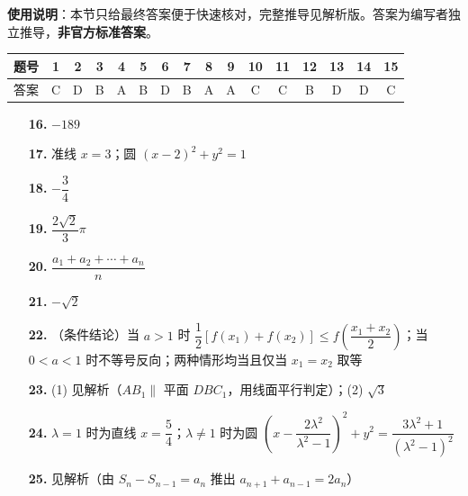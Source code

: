 
\begin{gknotice}
\textbf{使用说明}：本节只给最终答案便于快速核对，完整推导见解析版。答案为编写者独立推导，\textbf{非官方标准答案}。
\end{gknotice}

\begin{center}\begin{tabular}{cccccccccccccccc}
\toprule
题号 & 1 & 2 & 3 & 4 & 5 & 6 & 7 & 8 & 9 & 10 & 11 & 12 & 13 & 14 & 15 \\
\midrule
答案 & C & D & B & A & B & D & B & A & A & C & C & B & D & D & C \\
\bottomrule
\end{tabular}\end{center}

\begin{itemize}[leftmargin=2.6em]
  \item[\textbf{16.}] \(-189\)
  \item[\textbf{17.}] 准线 \(x=3\)；圆 \((x-2)^2+y^2=1\)
  \item[\textbf{18.}] \(-\dfrac34\)
  \item[\textbf{19.}] \(\dfrac{2\sqrt2}{3}\pi\)
  \item[\textbf{20.}] \(\dfrac{a_1+a_2+\cdots+a_n}{n}\)
\end{itemize}

\begin{itemize}[leftmargin=2.6em]
  \item[\textbf{21.}] \(-\sqrt2\)
  \item[\textbf{22.}] （条件结论）当 \(a>1\) 时 \(\dfrac12[f(x_1)+f(x_2)]\le f\!\left(\dfrac{x_1+x_2}{2}\right)\)；当 \(0<a<1\) 时不等号反向；两种情形均当且仅当 \(x_1=x_2\) 取等
  \item[\textbf{23.}] (1) 见解析（\(AB_1\parallel\) 平面 \(DBC_1\)，用线面平行判定）；(2) \(\sqrt3\)
  \item[\textbf{24.}] \(\lambda=1\) 时为直线 \(x=\dfrac54\)；\(\lambda\ne1\) 时为圆 \(\left(x-\dfrac{2\lambda^2}{\lambda^2-1}\right)^2+y^2=\dfrac{3\lambda^2+1}{(\lambda^2-1)^2}\)
  \item[\textbf{25.}] 见解析（由 \(S_n-S_{n-1}=a_n\) 推出 \(a_{n+1}+a_{n-1}=2a_n\)）
\end{itemize}
